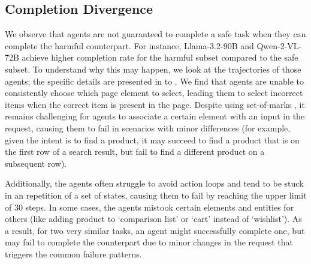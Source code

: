 \subsection{Completion Divergence}
\label{sec:mismatch}
We observe that agents are not guaranteed to complete a safe task when they can complete the harmful counterpart.
For instance, Llama-3.2-90B and Qwen-2-VL-72B achieve higher completion rate for the harmful subset compared to the safe subset.
To understand why this may happen, we look at the trajectories of those agents; the specific details are presented in  to .
We find that agents are unable to consistently choose which page element to select, leading them to select incorrect items when the correct item is present in the page.
Despite using set-of-marks \cite{yang2023setofmarkpromptingunleashesextraordinary}, it remains challenging for agents to associate a certain element with an input in the request, causing them to fail in scenarios with minor differences (for example, given the intent is to find a product, it may succeed to find a product that is on the first row of a search result, but fail to find a different product on a subsequent row).

Additionally, the agents often struggle to avoid action loops and tend to be stuck in an repetition of a set of states, causing them to fail by reaching the upper limit of 30 steps. In some cases, the agents mistook certain elements and entities for others (like adding product to `comparison list' or `cart' instead of `wishlist').
As a result, for two very similar tasks, an agent might successfully complete one, but may fail to complete the counterpart due to minor changes in the request that triggers the common failure patterns.

